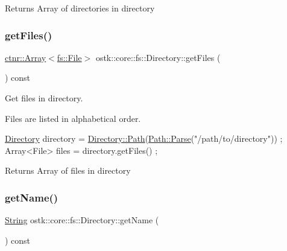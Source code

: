 \begin{DoxyReturn}{Returns}
Array of directories in directory 
\end{DoxyReturn}
\mbox{\label{classostk_1_1core_1_1fs_1_1_directory_a3181d3a31a90b0095aaca907c9b978ab}} 
\subsubsection{\texorpdfstring{get\+Files()}{getFiles()}}
{\footnotesize\ttfamily \hyperlink{classostk_1_1core_1_1ctnr_1_1_array}{ctnr\+::\+Array}$<$\hyperlink{classostk_1_1core_1_1fs_1_1_file}{fs\+::\+File}$>$ ostk\+::core\+::fs\+::\+Directory\+::get\+Files (\begin{DoxyParamCaption}{ }\end{DoxyParamCaption}) const}



Get files in directory. 

Files are listed in alphabetical order.


\begin{DoxyCode}
\hyperlink{classostk_1_1core_1_1fs_1_1_directory_adc893e10f55282be0d0455e9cfc5796b}{Directory} directory = \hyperlink{classostk_1_1core_1_1fs_1_1_directory_a0151dba2940d5f426b52209dc7dab2e5}{Directory::Path}(\hyperlink{classostk_1_1core_1_1fs_1_1_path_ad08539ba654f5df11c4bcb07276345ad}{Path::Parse}(\textcolor{stringliteral}{"/path/to/directory"}))
       ;
Array<File> files = directory.getFiles() ;
\end{DoxyCode}


\begin{DoxyReturn}{Returns}
Array of files in directory 
\end{DoxyReturn}
\mbox{\label{classostk_1_1core_1_1fs_1_1_directory_a0818daac289a2ebe5bd0c3db6edec77b}} 
\subsubsection{\texorpdfstring{get\+Name()}{getName()}}
{\footnotesize\ttfamily \hyperlink{classostk_1_1core_1_1types_1_1_string}{String} ostk\+::core\+::fs\+::\+Directory\+::get\+Name (\begin{DoxyParamCaption}{ }\end{DoxyParamCaption}) const}



